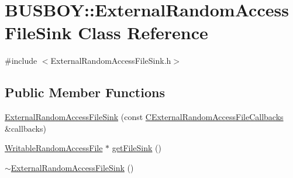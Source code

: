 \hypertarget{classBUSBOY_1_1ExternalRandomAccessFileSink}{
\section{BUSBOY::ExternalRandomAccessFileSink Class Reference}
\label{classBUSBOY_1_1ExternalRandomAccessFileSink}
}


{\ttfamily \#include $<$ExternalRandomAccessFileSink.h$>$}\subsection*{Public Member Functions}
\begin{DoxyCompactItemize}
\item 
\hyperlink{classBUSBOY_1_1ExternalRandomAccessFileSink_ad7ff7c357b918df30c78c8f30ff2a3ea}{ExternalRandomAccessFileSink} (const \hyperlink{structCExternalRandomAccessFileCallbacksStruct}{CExternalRandomAccessFileCallbacks} \&callbacks)
\item 
\hyperlink{classBUSBOY_1_1WritableRandomAccessFile}{WritableRandomAccessFile} $\ast$ \hyperlink{classBUSBOY_1_1ExternalRandomAccessFileSink_aca94bc2a3d7af5e34b170a6eefafd9df}{getFileSink} ()
\item 
\hyperlink{classBUSBOY_1_1ExternalRandomAccessFileSink_a5e7e28bc992756ffe22188324bb532d8}{$\sim$ExternalRandomAccessFileSink} ()
\end{DoxyCompactItemize}



